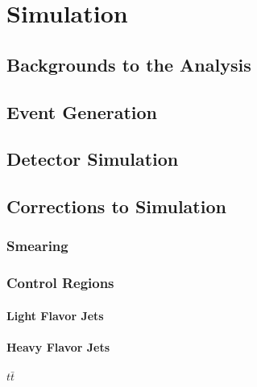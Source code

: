 \chapter{Simulation}

\section{Backgrounds to the Analysis}


\section{Event Generation}


\section{Detector Simulation}


\section{Corrections to Simulation}

\subsection{Smearing}

\subsection{Control Regions}

\subsubsection{Light Flavor Jets}

\subsubsection{Heavy Flavor Jets}

\subsubsection{$t\bar{t}$}